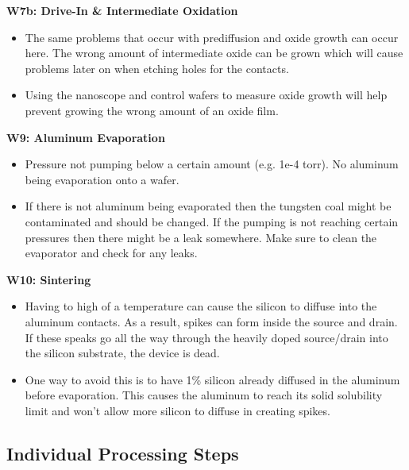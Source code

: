 \documentclass{article}
\begin{document}
\textbf{W7b: Drive-In \& Intermediate Oxidation}
\begin{itemize}
\item The same problems that occur with prediffusion and oxide growth can occur here. The wrong amount of intermediate oxide can be grown which will cause problems later on when etching holes for the contacts.
\item Using the nanoscope and control wafers to measure oxide growth will help prevent growing the wrong amount of an oxide film.
\end{itemize}

\textbf{W9: Aluminum Evaporation}
\begin{itemize}
\item Pressure not pumping below a certain amount (e.g. 1e-4 torr). No aluminum being evaporation onto a wafer.
\item If there is not aluminum being evaporated then the tungsten coal might be contaminated and should be changed. If the pumping is not reaching certain pressures then there might be a leak somewhere. Make sure to clean the evaporator and check for any leaks.
\end{itemize}

\textbf{W10: Sintering}
\begin{itemize}
\item Having to high of a temperature can cause the silicon to diffuse into the aluminum contacts. As a result, spikes can form inside the source and drain. If these speaks go all the way through the heavily doped source/drain into the silicon substrate, the device is dead.
\item One way to avoid this is to have 1\% silicon already diffused in the aluminum before evaporation. This causes the aluminum to reach its solid solubility limit and won't allow more silicon to diffuse in creating spikes.
\end{itemize}


\subsection{Individual Processing Steps}
\end{document}
